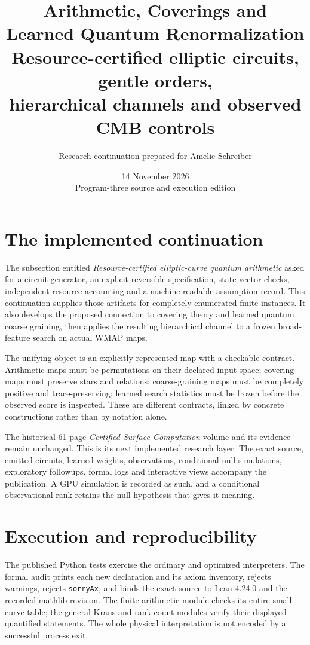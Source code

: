 \documentclass[11pt,oneside,openany]{book}
\title{\textbf{Arithmetic, Coverings and\\Learned Quantum Renormalization}\\[1em]\Large Resource-certified elliptic circuits, gentle orders,\\hierarchical channels and observed CMB controls}
\author{Research continuation prepared for Amelie Schreiber}
\date{14 November 2026\\\small Program-three source and execution edition}
\begin{document}
\frontmatter\maketitle
\chapter*{The implemented continuation}
The subsection entitled \emph{Resource-certified elliptic-curve quantum arithmetic} asked for a circuit generator, an explicit reversible specification, state-vector checks, independent resource accounting and a machine-readable assumption record. This continuation supplies those artifacts for completely enumerated finite instances. It also develops the proposed connection to covering theory and learned quantum coarse graining, then applies the resulting hierarchical channel to a frozen broad-feature search on actual WMAP maps.

The unifying object is an explicitly represented map with a checkable contract. Arithmetic maps must be permutations on their declared input space; covering maps must preserve stars and relations; coarse-graining maps must be completely positive and trace-preserving; learned search statistics must be frozen before the observed score is inspected. These are different contracts, linked by concrete constructions rather than by notation alone.

The historical 61-page \emph{Certified Surface Computation} volume and its evidence remain unchanged. This is its next implemented research layer. The exact source, emitted circuits, learned weights, observations, conditional null simulations, exploratory followups, formal logs and interactive views accompany the publication. A GPU simulation is recorded as such, and a conditional observational rank retains the null hypothesis that gives it meaning.
\tableofcontents\mainmatter



\chapter{Execution and reproducibility}


The published Python tests exercise the ordinary and optimized interpreters. The formal audit prints each new declaration and its axiom inventory, rejects warnings, rejects \texttt{sorryAx}, and binds the exact source to Lean 4.24.0 and the recorded mathlib revision. The finite arithmetic module checks its entire small curve table; the general Kraus and rank-count modules verify their displayed quantified statements. The whole physical interpretation is not encoded by a successful process exit.
\end{document}
